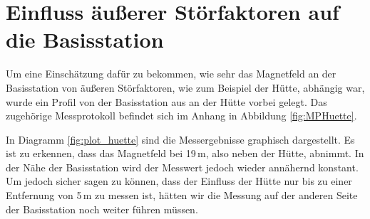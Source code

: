 \section{Einfluss äußerer Störfaktoren auf die Basisstation}

Um eine Einschätzung dafür zu bekommen, wie sehr das Magnetfeld an der Basisstation von äußeren Störfaktoren, wie zum Beispiel der Hütte, abhängig war, wurde ein Profil von der Basisstation aus an der Hütte vorbei gelegt. Das zugehörige Messprotokoll befindet sich im Anhang in Abbildung \ref{fig:MPHuette}.


In Diagramm \ref{fig:plot_huette} sind die Messergebnisse graphisch dargestellt. Es ist zu erkennen, dass das Magnetfeld bei 19\,m, also neben der Hütte, abnimmt. In der Nähe der Basisstation wird der Messwert jedoch wieder annähernd konstant. Um jedoch sicher sagen zu können, dass der Einfluss der Hütte nur bis zu einer Entfernung von 5\,m zu messen ist, hätten wir die Messung auf der anderen Seite der Basisstation noch weiter führen müssen.


